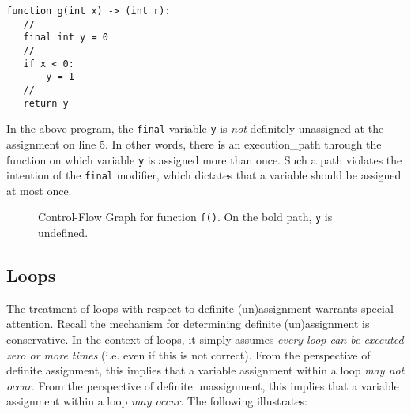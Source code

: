 \begin{lstlisting}
function g(int x) -> (int r):
   //
   final int y = 0
   //
   if x < 0:
       y = 1
   //
   return y
\end{lstlisting}

In the above program, the \lstinline{final} variable \lstinline{y} is
{\em not} definitely unassigned at the assignment on line 5.  In other
words, there is an \gls{execution_path} through the function on which
variable \lstinline{y} is assigned more than once.  Such a path
violates the intention of the \lstinline{final} modifier, which
dictates that a variable should be assigned at most once.

\begin{figure}[!t]
\centering
\caption{Control-Flow Graph for function \lstinline{f()}.  On the bold path, \lstinline{y} is undefined.}
\label{f:c8_cfg_1}
\end{figure}

\subsection{Loops}

The treatment of loops with respect to definite (un)assignment
warrants special attention.  Recall the mechanism for determining
definite (un)assignment is conservative.  In the context of loops, it
simply assumes {\em every loop can be executed zero or more times}
(i.e. even if this is not correct).  From the perspective of definite
assignment, this implies that a variable assignment within a loop {\em
  may not occur}.  From the perspective of definite unassignment, this
implies that a variable assignment within a loop {\em may occur}. The
following illustrates:

